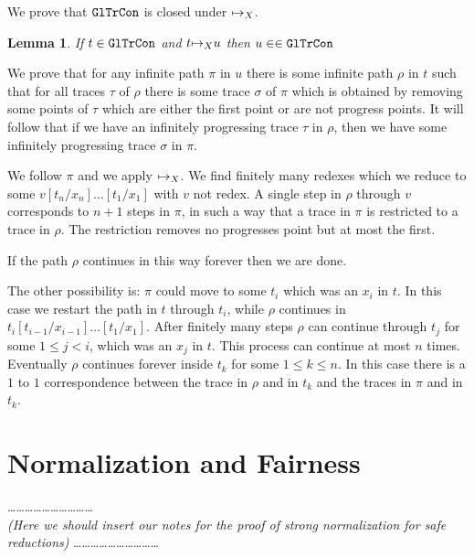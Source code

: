 \documentclass{article}
\newtheorem{lemma}[theorem]{Lemma}
\newenvironment{proof}[1][Proof]{\begin{trivlist}
\item[\hskip \labelsep {\bfseries #1}]}{\end{trivlist}}
\begin{document}
We prove that ${\tt GlTrCon}$ is closed under ${\mapsto}_X$.


\begin{lemma}
If $t \in {\tt GlTrCon}$ and $t {\mapsto}_X u$ then $u \in \in {\tt GlTrCon}$
\end{lemma}

\begin{proof}
We prove that for any infinite path $\pi$ in $u$ there is some infinite path $\rho$ in $t$ such that
for all traces $\tau$ of $\rho$ there is some trace $\sigma$ of $\pi$ which is obtained by
removing some points of $\tau$ which are either the first point or are not progress points. 
It will follow that if we have an infinitely progressing trace $\tau$ in $\rho$, then we have some infinitely
progressing trace $\sigma$ in $\pi$.

We follow $\pi$ and we apply ${\mapsto}_X$. We find finitely many redexes which we reduce to
some $v[t_n/x_n]\ldots[t_1/x_1]$ with $v$ not redex. A single step in $\rho$ through $v$
corresponds to $n+1$ steps in $\pi$, in such a way that a trace in $\pi$ is restricted to a trace
in $\rho$. The restriction removes no progresses point but at most the first. 

If the path $\rho$ continues in this way forever then we are done.

The other possibility is: $\pi$ could move to some $t_i$ which was an $x_i$ in $t$. In this case we restart
the path in $t$ through $t_i$, while $\rho$ continues in $t_i[t_{i-1}/x_{i-1}]\ldots[t_1/x_1]$.
After finitely many steps $\rho$ can continue through $t_j$ for some $1 \le j < i$, which was an $x_j$
in $t$. This process can continue at most $n$ times. 
Eventually $\rho$ continues forever inside $t_k$ for some $1 \le k \le n$. In this case there is a $1$ to $1$
correspondence between the trace in $\rho$ and in $t_k$ and the traces in $\pi$ and in $t_k$.
\end{proof}


\section{Normalization and Fairness}


\ldots\ldots\ldots\ldots\ldots\ldots\ldots\ldots\ldots\ldots
\\
\emph{(Here we should insert our notes for the proof of strong normalization for safe reductions)}
\ldots\ldots\ldots\ldots\ldots\ldots\ldots\ldots\ldots\ldots
\\
\end{document}
